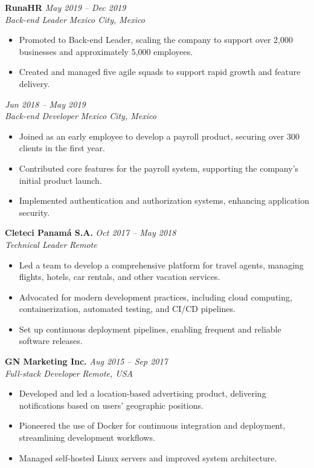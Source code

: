 \documentclass[a4paper,10pt]{article}
\begin{document}
\textbf{RunaHR} \hfill \textit{May 2019 -- Dec 2019}\\
\textit{Back-end Leader} \hfill \textit{Mexico City, Mexico}\\
\begin{itemize}[leftmargin=0.5cm, topsep=0pt, parsep=0pt, itemsep=2pt]
	\item Promoted to Back-end Leader, scaling the company to support over 2,000
	      businesses and approximately 5,000 employees.
	\item Created and managed five agile squads to support rapid growth and
	      feature delivery.
\end{itemize}

\textbf{} \hfill \textit{Jun 2018 -- May 2019}\\
\textit{Back-end Developer} \hfill \textit{Mexico City, Mexico}\\
\begin{itemize}[leftmargin=0.5cm, topsep=0pt, parsep=0pt, itemsep=2pt]
	\item Joined as an early employee to develop a payroll product, securing
	      over 300 clients in the first year.
	\item Contributed core features for the payroll system, supporting the
	      company’s initial product launch.
	\item Implemented authentication and authorization systems, enhancing
	      application security.
\end{itemize}

\textbf{Cleteci Panamá S.A.} \hfill \textit{Oct 2017 -- May 2018}\\
\textit{Technical Leader} \hfill \textit{Remote}\\
\begin{itemize}[leftmargin=0.5cm, topsep=0pt, parsep=0pt, itemsep=2pt]
	\item Led a team to develop a comprehensive platform for travel agents,
	      managing flights, hotels, car rentals, and other vacation services.
	\item Advocated for modern development practices, including cloud computing,
	      containerization, automated testing, and CI/CD pipelines.
	\item Set up continuous deployment pipelines, enabling frequent and reliable
	      software releases.
\end{itemize}

\textbf{GN Marketing Inc.} \hfill \textit{Aug 2015 -- Sep 2017}\\
\textit{Full-stack Developer} \hfill \textit{Remote, USA}\\
\begin{itemize}[leftmargin=0.5cm, topsep=0pt, parsep=0pt, itemsep=2pt]
	\item Developed and led a location-based advertising product, delivering
	      notifications based on users’ geographic positions.
	\item Pioneered the use of Docker for continuous integration and deployment,
	      streamlining development workflows.
	\item Managed self-hosted Linux servers and improved system architecture.
\end{itemize}
\end{document}

